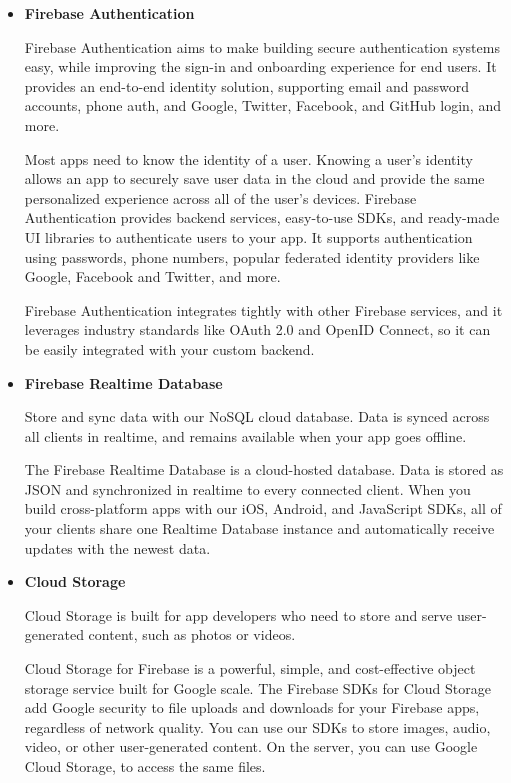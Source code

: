 \begin{itemize}
\begin{itemize}
\item \textbf{Firebase Authentication}

Firebase Authentication aims to make building secure authentication systems easy, while improving the sign-in and onboarding experience for end users. It provides an end-to-end identity solution, supporting email and password accounts, phone auth, and Google, Twitter, Facebook, and GitHub login, and more.

Most apps need to know the identity of a user. Knowing a user's identity allows an app to securely save user data in the cloud and provide the same personalized experience across all of the user's devices.
Firebase Authentication provides backend services, easy-to-use SDKs, and ready-made UI libraries to authenticate users to your app. It supports authentication using passwords, phone numbers, popular federated identity providers like Google, Facebook and Twitter, and more.

Firebase Authentication integrates tightly with other Firebase services, and it leverages industry standards like OAuth 2.0 and OpenID Connect, so it can be easily integrated with your custom backend.

\item \textbf{Firebase Realtime Database}

Store and sync data with our NoSQL cloud database. Data is synced across all clients in realtime, and remains available when your app goes offline.

The Firebase Realtime Database is a cloud-hosted database. Data is stored as JSON and synchronized in realtime to every connected client. When you build cross-platform apps with our iOS, Android, and JavaScript SDKs, all of your clients share one Realtime Database instance and automatically receive updates with the newest data.


\item \textbf{Cloud Storage}

Cloud Storage is built for app developers who need to store and serve user-generated content, such as photos or videos.

Cloud Storage for Firebase is a powerful, simple, and cost-effective object storage service built for Google scale. The Firebase SDKs for Cloud Storage add Google security to file uploads and downloads for your Firebase apps, regardless of network quality. You can use our SDKs to store images, audio, video, or other user-generated content. On the server, you can use Google Cloud Storage, to access the same files.
	\end{itemize}
	\end{itemize}
	
